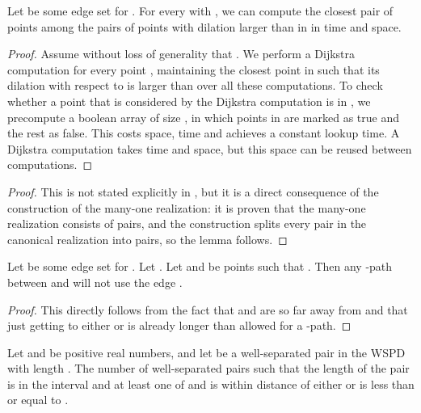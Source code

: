 \documentclass[runningheads,envcountsame,oribibl,orivec]{llncs}
\begin{document}
\begin{lemma} \label{lemma:dijkstra}
Let  be some edge set for . For every  with , we can compute the closest pair of points  among the pairs of points with dilation larger than  in  in  time and  space.
\end{lemma}

\begin{proof}
Assume without loss of generality that . We perform a Dijkstra computation for every point , maintaining the closest point in  such that its dilation with respect to  is larger than  over all these computations. To check whether a point that is considered by the Dijkstra computation is in , we precompute a boolean array of size , in which points in  are marked as true and the rest as false. This costs  space,  time and achieves a constant lookup time. A Dijkstra computation takes  time and  space, but this space can be reused between computations.
\end{proof}

\begin{fact}\label{fact:manyone}

\end{fact}
\begin{proof}
This is not stated explicitly in \cite{Callahan95dealingwith}, but it is a direct consequence of the construction of the many-one realization: it is proven that the many-one realization consists of  pairs, and the construction splits every pair in the canonical realization into  pairs, so the lemma follows.
\end{proof}

\begin{observation} \label{observation:faraway}
Let  be some edge set for . Let . Let  and  be points such that . Then any -path between  and  will not use the edge .
\end{observation}

\begin{proof}
This directly follows from the fact that  and  are so far away from  and  that just getting to either  or  is already longer than allowed for a -path.
\end{proof}

\begin{fact} \label{fact:packing}
Let  and  be positive real numbers, and let  be a well-separated pair in the WSPD with length . The number of well-separated pairs  such that the length of the pair is in the interval  and at least one of  and  is within distance  of either  or  is less than or equal to .
\end{fact}
\end{document}
